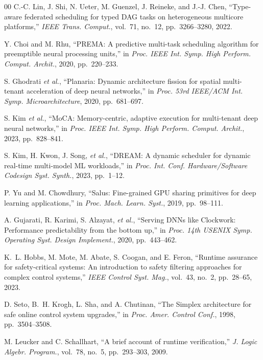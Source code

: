 \documentclass[lettersize,journal]{IEEEtran}
\begin{document}
\begin{thebibliography}{00}
C.-C. Lin, J. Shi, N. Ueter, M. Guenzel, J. Reineke, and J.-J. Chen,
``Type-aware federated scheduling for typed DAG tasks on heterogeneous
multicore platforms,'' \emph{IEEE Trans. Comput.}, vol.~71, no.~12,
pp.~3266--3280, 2022.

Y. Choi and M. Rhu, ``PREMA: A predictive multi-task scheduling algorithm for
preemptible neural processing units,'' in \emph{Proc. IEEE Int. Symp. High
Perform. Comput. Archit.}, 2020, pp.~220--233.

S. Ghodrati \emph{et al.}, ``Planaria: Dynamic architecture fission for
spatial multi-tenant acceleration of deep neural networks,'' in \emph{Proc.
53rd IEEE/ACM Int. Symp. Microarchitecture}, 2020, pp.~681--697.

S. Kim \emph{et al.}, ``MoCA: Memory-centric, adaptive execution for
multi-tenant deep neural networks,'' in \emph{Proc. IEEE Int. Symp. High
Perform. Comput. Archit.}, 2023, pp.~828--841.

S. Kim, H. Kwon, J. Song, \emph{et al.}, ``DREAM: A dynamic scheduler for
dynamic real-time multi-model ML workloads,'' in \emph{Proc. Int. Conf.
Hardware/Software Codesign Syst. Synth.}, 2023, pp.~1--12.

P. Yu and M. Chowdhury, ``Salus: Fine-grained GPU sharing primitives for deep
learning applications,'' in \emph{Proc. Mach. Learn. Syst.}, 2019,
pp.~98--111.

A. Gujarati, R. Karimi, S. Alzayat, \emph{et al.}, ``Serving DNNs like
Clockwork: Performance predictability from the bottom up,'' in \emph{Proc.
14th USENIX Symp. Operating Syst. Design Implement.}, 2020, pp.~443--462.

K.~L. Hobbs, M. Mote, M. Abate, S. Coogan, and E. Feron, ``Runtime assurance
for safety-critical systems: An introduction to safety filtering approaches
for complex control systems,'' \emph{IEEE Control Syst. Mag.}, vol.~43, no.~2,
pp.~28--65, 2023.

D. Seto, B.~H. Krogh, L. Sha, and A. Chutinan, ``The Simplex architecture for
safe online control system upgrades,'' in \emph{Proc. Amer. Control Conf.},
1998, pp.~3504--3508.

M. Leucker and C. Schallhart, ``A brief account of runtime verification,''
\emph{J. Logic Algebr. Program.}, vol.~78, no.~5, pp.~293--303, 2009.


\end{thebibliography}
\end{document}
